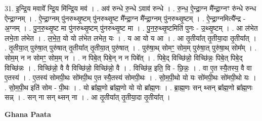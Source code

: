 \documentclass[17pt]{extarticle}
\begin{document}
31. इ॒न्द्रि॒य मवावे᳚ न्द्रि॒य मि॑न्द्रि॒य मव॑ । . अव॑ रुन्धे रु॒न्धे ऽवाव॑ रुन्धे । . रु॒न्ध॒ ऐ॒न्द्रा॒ग्न मै᳚न्द्रा॒ग्नꣳ रु॑न्धे रुन्ध ऐन्द्रा॒ग्नम् । . ऐ॒न्द्रा॒ग्नम् पु॑नरुथ्सृ॒ष्टम् पु॑नरुथ्सृ॒ष्ट मै᳚न्द्रा॒ग्न मै᳚न्द्रा॒ग्नम् पु॑नरुथ्सृ॒ष्टम् । . ऐ॒न्द्रा॒ग्नमित्यै᳚न्द्र - अ॒ग्नम् । . पु॒न॒रु॒थ्सृ॒ष्ट मा पु॑नरुथ्सृ॒ष्टम् पु॑नरुथ्सृ॒ष्ट मा । . पु॒न॒रु॒थ्सृ॒ष्टमिति॑ पुनः - उ॒थ्सृ॒ष्टम् । . आ ल॑भेत लभे॒ता ल॑भेत । . ल॒भे॒त॒ यो यो ल॑भेत लभेत॒ यः । . य आ यो य आ । . आ तृ॒तीया᳚त् तृ॒तीया॒दा तृ॒तीया᳚त् । . तृ॒तीया॒त् पुरु॑षा॒त् पुरु॑षात् तृ॒तीया᳚त् तृ॒तीया॒त् पुरु॑षात् । . पुरु॑षा॒थ् सोमꣳ॒॒ सोम॒म् पुरु॑षा॒त् पुरु॑षा॒थ् सोम᳚म् । . सोम॒म् न न सोमꣳ॒॒ सोम॒म् न । . न पिबे॒त् पिबे॒न् न न पिबे᳚त् । . पिबे॒द् विच्छि॑न्नो॒ विच्छि॑न्नः॒ पिबे॒त् पिबे॒द् विच्छि॑न्नः । . विच्छि॑न्नो॒ वै वै विच्छि॑न्नो॒ विच्छि॑न्नो॒ वै । . विच्छि॑न्न॒ इति॒ वि - छि॒न्नः॒ । . वा ए॒त स्यै॒तस्य॒ वै वा ए॒तस्य॑ । . ए॒तस्य॑ सोमपी॒थः सो॑मपी॒थ ए॒त स्यै॒तस्य॑ सोमपी॒थः । . सो॒म॒पी॒थो यो यः सो॑मपी॒थः सो॑मपी॒थो यः । . सो॒म॒पी॒थ इति॑ सोम - पी॒थः । . यो ब्रा᳚ह्म॒णो ब्रा᳚ह्म॒णो यो यो ब्रा᳚ह्म॒णः । . ब्रा॒ह्म॒णः सन् थ्सन् ब्रा᳚ह्म॒णो ब्रा᳚ह्म॒णः सन्न् । . सन् ना सन् थ्सन् ना । . आ तृ॒तीया᳚त् तृ॒तीया॒दा तृ॒तीया᳚त् । \newline

\textbf{Ghana Paata } \newline
\end{document}
